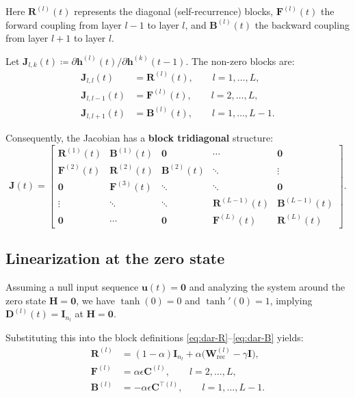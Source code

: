 Here $\mathbf{R}^{(l)}(t)$ represents the diagonal (self-recurrence) blocks, $\mathbf{F}^{(l)}(t)$ the forward coupling from layer $l-1$ to layer $l$, and $\mathbf{B}^{(l)}(t)$ the backward coupling from layer $l+1$ to layer $l$.

Let $\mathbf{J}_{l,k}(t)\coloneqq \partial \mathbf{h}^{(l)}(t)/\partial \mathbf{h}^{(k)}(t-1)$. The non-zero blocks are:
\begin{align}
\mathbf{J}_{l,l}(t) &= \mathbf{R}^{(l)}(t), \qquad l=1,\dots,L, \label{eq:dar-J-diag}\\
\mathbf{J}_{l,l-1}(t) &= \mathbf{F}^{(l)}(t), \qquad l=2,\dots,L, \label{eq:dar-J-sub}\\
\mathbf{J}_{l,l+1}(t) &= \mathbf{B}^{(l)}(t), \qquad l=1,\dots,L-1. \label{eq:dar-J-super}
\end{align}

Consequently, the Jacobian has a \textbf{block tridiagonal} structure:
\[
\mathbf{J}(t) =
\begin{bmatrix}
\mathbf{R}^{(1)}(t) & \mathbf{B}^{(1)}(t) & \mathbf{0} & \cdots & \mathbf{0} \\
\mathbf{F}^{(2)}(t) & \mathbf{R}^{(2)}(t) & \mathbf{B}^{(2)}(t) & \ddots & \vdots \\
\mathbf{0} & \mathbf{F}^{(3)}(t) & \ddots & \ddots & \mathbf{0} \\
\vdots & \ddots & \ddots & \mathbf{R}^{(L-1)}(t) & \mathbf{B}^{(L-1)}(t) \\
\mathbf{0} & \cdots & \mathbf{0} & \mathbf{F}^{(L)}(t) & \mathbf{R}^{(L)}(t)
\end{bmatrix}.
\]


\subsection{Linearization at the zero state}

Assuming a null input sequence $\mathbf{u}(t) = \mathbf{0}$ and analyzing the system around the zero state $\mathbf{H} = \mathbf{0}$, we have $\tanh(0)=0$ and $\tanh'(0)=1$, implying $\mathbf{D}^{(l)}(t) = \mathbf{I}_{n_l}$ at $\mathbf{H}=\mathbf{0}$.

Substituting this into the block definitions \eqref{eq:dar-R}--\eqref{eq:dar-B} yields:
\begin{align}
\mathbf{R}^{(l)} &= (1-\alpha)\mathbf{I}_{n_l} + \alpha \big(\mathbf{W}_{\text{rec}}^{(l)} - \gamma \mathbf{I}\big), \label{eq:dar-R-lin}\\
\mathbf{F}^{(l)} &= \alpha \epsilon \mathbf{C}^{(l)},\qquad l=2,\dots,L, \label{eq:dar-F-lin}\\
\mathbf{B}^{(l)} &= -\alpha \epsilon \mathbf{C}^{\top(l)},\qquad l=1,\dots,L-1. \label{eq:dar-B-lin}
\end{align}

